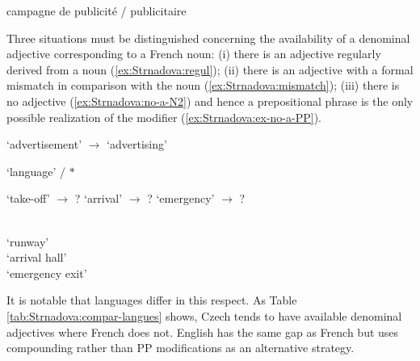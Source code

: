 \documentclass[output=paper]{LSP/langsci}
\begin{document}
\begin{exe}
\ex  \label{ex:Strnadova:paire-publicité} {campagne de publicité / publicitaire}
\end{exe}

Three situations must be distinguished concerning the availability of a denominal adjective corresponding to a French noun: (i) there is an adjective regularly derived from a noun (\ref{ex:Strnadova:regul}); (ii) there is an adjective with a formal mismatch in comparison with the noun (\ref{ex:Strnadova:mismatch}); (iii) there is no adjective (\ref{ex:Strnadova:no-a-N2}) and hence a prepositional phrase is the only possible realization of the modifier (\ref{ex:Strnadova:ex-no-a-PP}).

\begin{exe}
\ex \label{ex:Strnadova:regul}  `advertisement' $\rightarrow$  `advertising'
\end{exe}

\begin{exe}
\ex  \label{ex:Strnadova:mismatch}  `language' \rel  {} / $\ast$
\end{exe}

\begin{exe}
\ex \label{ex:Strnadova:no-a-N2} \begin{xlist}
\ex {} `take-off' $\rightarrow$ ?
\ex {} `arrival' $\rightarrow$ ?
\ex {} `emergency' $\rightarrow$ ?
\end{xlist}
\end{exe}

\begin{exe}
\ex  \label{ex:Strnadova:ex-no-a-PP} \begin{xlist}
\\ `runway'
\\ `arrival hall'
\\ `emergency exit'
\end{xlist}
\end{exe}

It is notable that languages differ in this respect. As Table \ref{tab:Strnadova:compar-langues} shows, Czech tends to have available denominal adjectives where French does not. English has the same gap as French but uses compounding rather than PP modifications as an alternative strategy.
\end{document}
